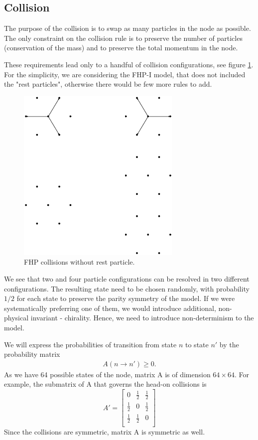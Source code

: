 \subsection{Collision}

The purpose of the collision is to swap as many particles in the node as possible.
The only constraint on the collision rule is to preserve the number of particles (conservation of the mass) and to preserve the total momentum in the node.

These requirements lead only to a handful of collision configurations, see figure \ref{FHPcol}. For the simplicity, we are considering the FHP-I model, that does not included the "rest particles", otherwise there would be few more rules to add.

\begin{figure}[H]
 \centering
 \includegraphics[width=0.7\textwidth]{./img/FHPcol}
 \caption{FHP collisions without rest particle.}
 \label{FHPcol}
\end{figure}

We see that two and four particle configurations can be resolved in two different configurations. The resulting state need to be chosen randomly, with probability $1/2$ for each state to preserve the parity symmetry of the model. If we were systematically preferring one of them, we would introduce additional, non-physical invariant - chirality. Hence, we need to introduce non-determinism to the model.


We will express the probabilities of transition from state $n$ to state $n'$ by the probability matrix
\begin{align*}
A(n \rightarrow n') \geq 0.
\end{align*}
As we have 64 possible states of the node, matrix A is of dimension $64\times 64$.
For example, the submatrix of A that governs the head-on collisions is
\[
 A'=
  \begin{bmatrix}
    0 & \frac{1}{2} & \frac{1}{2} \\
    \frac{1}{2} & 0 & \frac{1}{2} \\
    \frac{1}{2} & \frac{1}{2} & 0 \\
  \end{bmatrix}
\]
Since the collisions are symmetric, matrix A is symmetric as well.

